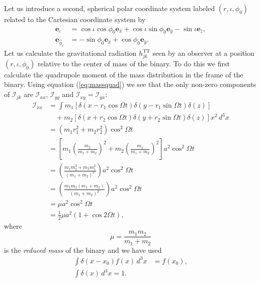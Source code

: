 Let us introduce a second, spherical polar coordinate system labeled
$(r,\iota,\phi_0)$ related to the Cartesian coordinate system by
\begin{align}
\boldsymbol{e}_{\hat{\iota}} &= 
\cos \iota \cos \phi_0 \boldsymbol{e}_{\hat{x}} 
+ \cos \iota \sin \phi_0 \boldsymbol{e}_{\hat{y}} 
- \sin \iota \boldsymbol{e}_{\hat{z}}, \\
\boldsymbol{e}_{\hat{\phi}_c} &= 
- \sin \phi_0 \boldsymbol{e}_{\hat{x}} 
+ \cos \phi_0 \boldsymbol{e}_{\hat{y}}.
\end{align}
Let us calculate the gravitational radiation $h_{jk}^\mathrm{TT}$ seen by an
observer at a position $(r,\iota,\phi_0)$ relative to the center of mass of
the binary. To do this we first calculate the quadrupole moment of the mass
distribution in the frame of the binary. Using equation (\ref{eq:massquad}) we
see that the only non-zero components of $\mathcal{I}_{jk}$ are
$\mathcal{I}_{xx}$, $\mathcal{I}_{yy}$ and $\mathcal{I}_{xy} =
\mathcal{I}_{yx}$:
\begin{equation}
\begin{split}
\mathcal{I}_{xx} &= \int 
m_1\left[\delta(x - r_1 \cos\Omega t) \delta(y - r_1 \sin\Omega
t)\delta(z)\right] \\
&\quad +
m_2\left[\delta(x + r_2 \cos\Omega t) \delta(y + r_2 \sin\Omega
t)\delta(z)\right] x^2\, d^3 x \\
&= (m_1 r_1^2 + m_2 r_2^2) \cos^2 \Omega t \\
&= \left[ m_1 \left(\frac{m_2}{m_1 + m_2}\right)^2 + 
m_2 \left(\frac{m_1}{m_1 + m_2}\right)^2 \right] a^2\cos^2\Omega t \\
&= \left(  \frac{m_1 m_2^2 + m_2 m_1^2}{(m_1 + m_2)^2}\right) a^2\cos^2\Omega t \\
&= \left( \frac{m_1 m_2 (m_1 + m_2)}{(m_1 + m_2)^2} \right) a^2\cos^2\Omega t \\
&= \mu a^2\cos^2\Omega t \\
&= \frac{1}{2} \mu a^2 \left(1 + \cos 2 \Omega t \right),
\end{split}
\end{equation}
where
\begin{equation}
\mu = \frac{m_1 m_2}{m_1 + m_2} 
\end{equation}
is the \emph{reduced mass} of the binary and we have used
\begin{equation}
\begin{split}
\int \delta(x-x_0) f(x)\, d^3x &= f(x_0), \\
\int \delta(x)\, d^3x = 1.
\end{split}
\end{equation}
